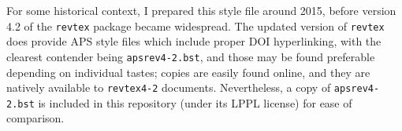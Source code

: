 \documentclass[%
  reprint,
  aps,
  pra,
  superscriptaddress,
  a4paper
]{revtex4-2}
\begin{document}
For some historical context, I prepared this style file around 2015, before version 4.2 of the \texttt{revtex} package became widespread. 
The updated version of \texttt{revtex} does provide APS style files which include proper DOI hyperlinking, with the clearest contender being \texttt{apsrev4-2.bst}, and those may be found preferable depending on individual tastes; copies are easily found online, and they are natively available to \texttt{revtex4-2} documents. 
Nevertheless, a copy of \texttt{apsrev4-2.bst} is included in this repository (under its LPPL license) for ease of comparison.


%

{}
\end{document}
